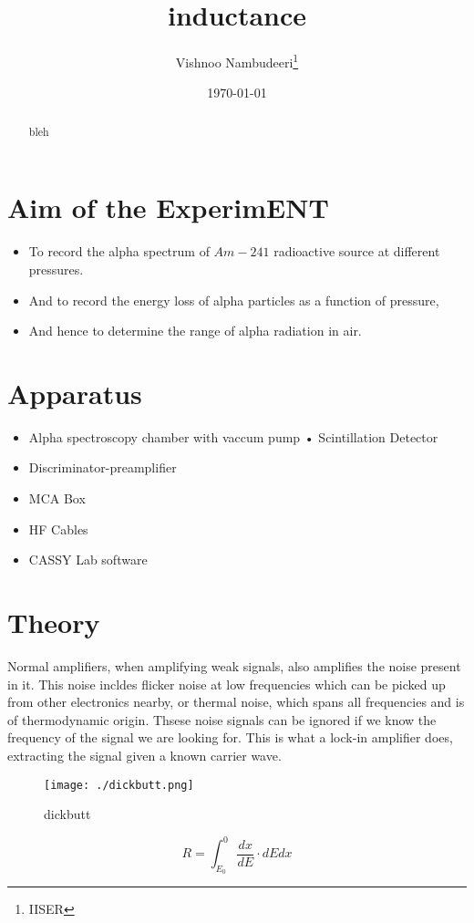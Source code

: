 \documentclass{ieeeconf}
\begin{document}
\title{inductance}

\author{Vishnoo Nambudeeri\thanks{IISER}}

\date{\today}
\maketitle

\begin{abstract}
bleh

\end{abstract}
\section{Aim of the ExperimENT}
\begin{itemize}
\tightlist
\item
To record the alpha spectrum of \(Am-241\) radioactive source at different pressures.
\item
And to record the energy loss of alpha particles as a function of pressure,
\item
And hence to determine the range of alpha radiation in air.
\end{itemize}
\section{Apparatus}
\begin{itemize}
\tightlist
\item
Alpha spectroscopy chamber with vaccum pump • Scintillation Detector
\item
Discriminator-preamplifier
\item
MCA Box
\item
HF Cables
\item
CASSY Lab software
\end{itemize}
\section{Theory}
Normal amplifiers, when amplifying weak signals, also amplifies the noise present in it. This noise incldes flicker noise at low frequencies which can be picked up from other electronics nearby, or thermal noise, which spans all frequencies and is of thermodynamic origin. Thsese noise signals can be ignored if we know the frequency of the signal we are looking for. This is what a lock-in amplifier does, extracting the signal given a known carrier wave.

\begin{figure}[H]
\centering
\texttt{[image: ./dickbutt.png]}
\caption{dickbutt}
\label{fig:"dickbutt"}
\end{figure}
\[
R=\int_{E_0}^0 \frac{dx}{dE}\cdot dE dx
\]
\end{document}
